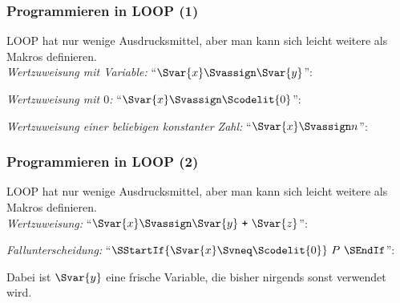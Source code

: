 \documentclass[aspectratio=1610,onlymath]{beamer}
\begin{document}
\begin{frame}[t]\frametitle{Programmieren in LOOP (1)}

LOOP hat nur wenige Ausdrucksmittel, aber man kann sich leicht weitere als Makros definieren.\\[1ex]

\emph{Wertzuweisung mit Variable:} ``$\Svar{x}\Svassign \Svar{y}$'':\pause

\bigskip\pause

\emph{Wertzuweisung mit $0$:} ``$\Svar{x}\Svassign \Scodelit{0}$'':\pause

\bigskip\pause

\emph{Wertzuweisung einer beliebigen konstanter Zahl:} ``$\Svar{x}\Svassign n$'':\pause


\end{frame}

\begin{frame}[t]\frametitle{Programmieren in LOOP (2)}

LOOP hat nur wenige Ausdrucksmittel, aber man kann sich leicht weitere als Makros definieren.\\[1ex]

\emph{Wertzuweisung:} ``$\Svar{x}\Svassign \Svar{y}~\texttt{+}~\Svar{z}$'':\pause

\bigskip\pause


\emph{Fallunterscheidung:} ``$\SStartIf{\Svar{x}\Svneq\Scodelit{0}}~P~\SEndIf$'':\pause

\medskip

Dabei ist $\Svar{y}$ eine frische Variable, die bisher nirgends sonst verwendet wird.


\end{frame}
\end{document}
